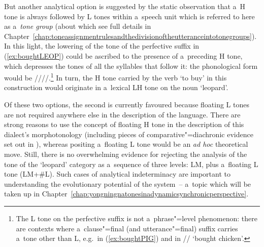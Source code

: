 But another analytical option is suggested by the static observation that a~H tone is always followed by
L tones within a~speech unit which is referred to here as a~\textit{tone group} (about which see full details in Chapter~\ref{chap:toneassignmentrulesandthedivisionoftheutteranceintotonegroups}). In this light, the
lowering of the tone of the {perfective} suffix in (\ref{ex:boughtLEOP})
could be ascribed to the presence of a~preceding H tone, which depresses the tones of all the
syllables that follow it: the phonological form would be ////.\footnote{The L tone on the {perfective} {suffix} is not a~phrase"=level phenomenon: there are contexts where a~clause"=final (and utterance"=final) {suffix} carries a~tone other than L, e.g.~in (\ref{ex:boughtPIG}) and in // ‘bought chicken’.} In turn, the H tone
carried by the verb ‘to buy’ in this construction would originate in a~lexical LH tone on the noun
‘leopard’.

Of these two options, the second is currently favoured because floating L tones are not required
anywhere else in the description of the language. There are strong reasons to use the concept of floating H tone in the description of this dialect's morphotonology (including pieces of comparative"={diachronic} evidence set out in ), whereas positing a~floating L
tone would be an \textit{ad hoc} theoretical move. Still, there is no overwhelming evidence for
rejecting the analysis of the tone of the ‘leopard’ category as a~sequence of three levels: LM, plus
a~floating L tone (LM+\#L). Such cases of analytical indeterminacy are important to understanding
the evolutionary potential of the system~-- a~topic which will be taken up in Chapter~\ref{chap:yongningnatonesinadynamicsynchronicperspective}.


